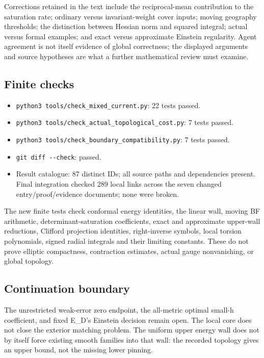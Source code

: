 \documentclass[
  10pt,
]{article}
\providecommand{\tightlist}{%
  \setlength{\itemsep}{0pt}\setlength{\parskip}{0pt}}
\begin{document}
Corrections retained in the text include the reciprocal-mean
contribution to the saturation rate; ordinary versus invariant-weight
cover inputs; moving geography thresholds; the distinction between
Hessian norm and squared integral; actual versus formal examples; and
exact versus approximate Einstein regularity. Agent agreement is not
itself evidence of global correctness; the displayed arguments and
source hypotheses are what a further mathematical review must examine.

\hypertarget{finite-checks-1}{%
\subsection{Finite checks}\label{finite-checks-1}}

\begin{itemize}
\tightlist
\item
  \texttt{python3\ tools/check\_mixed\_current.py}: 22 tests passed.
\item
  \texttt{python3\ tools/check\_actual\_topological\_cost.py}: 7 tests
  passed.
\item
  \texttt{python3\ tools/check\_boundary\_compatibility.py}: 7 tests
  passed.
\item
  \texttt{git\ diff\ -\/-check}: passed.
\item
  Result catalogue: 87 distinct IDs; all source paths and dependencies
  present. Final integration checked 289 local links across the seven
  changed entry/proof/evidence documents; none were broken.
\end{itemize}

The new finite tests check conformal energy identities, the linear wall,
moving BF arithmetic, determinant-saturation coefficients, exact and
approximate upper-wall reductions, Clifford projection identities,
right-inverse symbols, local torsion polynomials, signed radial
integrals and their limiting constants. These do not prove elliptic
compactness, contraction estimates, actual gauge nonvanishing, or global
topology.

\hypertarget{continuation-boundary}{%
\subsection{Continuation boundary}\label{continuation-boundary}}

The unrestricted weak-error zero endpoint, the all-metric optimal
small-h coefficient, and fixed E\_D's Einstein decision remain open. The
local core does not close the exterior matching problem. The uniform
upper energy wall does not by itself force existing smooth families into
that wall: the recorded topology gives an upper bound, not the missing
lower pinning.
\end{document}
